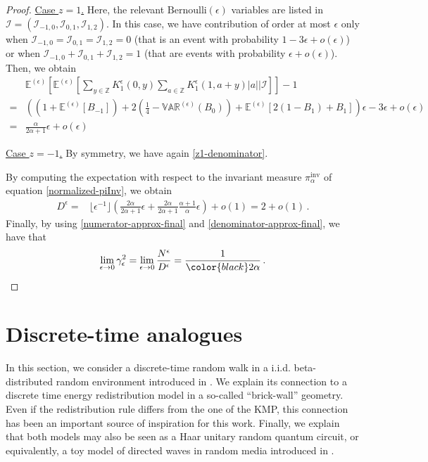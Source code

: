 \documentclass[a4paper,11pt,oneside,reqno]{amsart}
\theoremstyle{definition}
\numberwithin{equation}{section}
\begin{document}
\begin{proof}
	\item{\underline{Case $z=1$.}} Here, the relevant $\text{Bernoulli}(\epsilon)$ variables are listed in  $\bm{\mathcal{I}}=(\mathcal{I}_{-1,0},\mathcal{I}_{0,1},\mathcal{I}_{1,2})$. 	 In this case, we have contribution of order at most $\epsilon$ only when $\mathcal{I}_{-1,0}=\mathcal{I}_{0,1}=\mathcal{I}_{1,2}=0$ (that is an event with probability $1-3\epsilon+o(\epsilon)$) or when  $\mathcal{I}_{-1,0}+\mathcal{I}_{0,1}+\mathcal{I}_{1,2}=1$ (that are events with probability $\epsilon+o(\epsilon)$). Then, we obtain
	\begin{equation}\label{z1-denominator}
		\begin{split}
			&\mathbb{E}^{(\epsilon)}\left[\mathbb{E}^{(\epsilon)}\left[\sum_{y\in \mathbb{Z}}K_{1}^{\epsilon}(0,y)\sum_{a\in \mathbb{Z}}K_{1}^{\epsilon}(1,a+y)|a|\bigg| \bm{\mathcal{I}}\right]\right]-1
\\=&
			  \left(\left(1+\mathbb{E}^{(\epsilon)}[B_{-1}]\right)+2\left(\frac{1}{4}-\mathbb{VAR}^{(\epsilon)}(B_{0})\right)
			  +\mathbb{E}^{(\epsilon)}[2(1-B_{1})+B_{1}]\right)\epsilon-3\epsilon+o(\epsilon)
\\=&
		\frac{\alpha}{2\alpha+1}\epsilon+o(\epsilon)
		\end{split}
	\end{equation}
\item{\underline{Case $z=-1$.}}  By symmetry, we have again \eqref{z1-denominator}.

	By computing the expectation with respect to the invariant measure $\pi^{\text{inv}}_{\alpha}$ of equation \eqref{normalized-piInv}, we obtain 
	\begin{equation}\label{denominator-approx-final}
		\begin{split}
			D^{\epsilon}=&\lfloor\epsilon^{-1}\rfloor\left(\frac{2\alpha}{2\alpha+1}\epsilon+\frac{2\alpha}{2\alpha+1}\frac{\alpha+1}{\alpha}\epsilon\right)+o(1)=2+o(1)\,.
		\end{split}
	\end{equation}
	Finally, by using \eqref{numerator-approx-final} and \eqref{denominator-approx-final}, we have that
	\begin{equation*}
		\lim_{\epsilon\to 0}\gamma_{\epsilon}^{2}=  \lim_{\epsilon\to 0}\frac{N^{\epsilon}}{D^{\epsilon}}=\frac{1}{{\color{black}2}\alpha}\,.
	\end{equation*}
\end{proof}
\appendix
\section{Discrete-time analogues}\label{appendix-DtModels}
In this section, we consider a discrete-time random walk in a i.i.d. beta-distributed random environment introduced in \cite{barraquand2015}. We explain its connection to  a discrete time energy redistribution model in a so-called ``brick-wall'' geometry. Even if the redistribution rule differs from the one of the KMP, this connection has been an important source of inspiration for this work. Finally, we explain that both models may also be seen as a Haar unitary random quantum circuit, or equivalently,  a toy model of directed waves in random media introduced in \cite{kardar1992}. 
\end{document}
